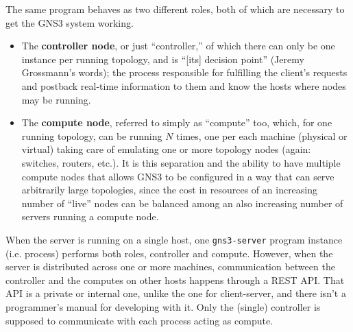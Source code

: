 The same program behaves as two different roles, both of which are necessary to get the GNS3 system working.

\begin{itemize}
	\item The \textbf{controller node}, or just ``controller,'' of which there can only be one instance per running topology, and is ``[its] decision point'' (Jeremy Grossmann's words); the process responsible for fulfilling the client's requests and postback real-time information to them and know the hosts where nodes may be running.
	\item The \textbf{compute node}, referred to simply as ``compute'' too, which, for one running topology, can be running $N$ times, one per each machine (physical or virtual) taking care of emulating one or more topology nodes (again: switches, routers, etc.).
	It is this separation and the ability to have multiple compute nodes that allows GNS3 to be configured in a way that can serve arbitrarily large topologies, since the cost in resources of an increasing number of ``live'' nodes can be balanced among an also increasing number of servers running a compute node.
\end{itemize}

When the server is running on a single host, one \texttt{gns3-server} program instance (i.e. process) performs both roles, controller and compute.
However, when the server is distributed across one or more machines, communication between the controller and the computes on other hosts happens through a REST API.
That API is a private or internal one, unlike the one for client-server, and there isn't a programmer's manual for developing with it.
Only the (single) controller is supposed to communicate with each process acting as compute.

